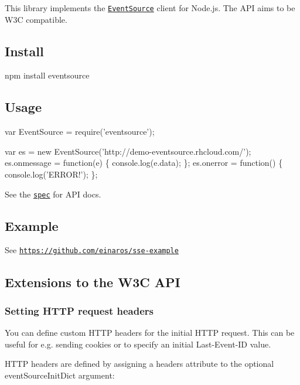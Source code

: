 \href{https://nodei.co/npm/eventsource/}{\tt } \href{https://nodei.co/npm/eventsource/}{\tt }

This library implements the \href{http://dev.w3.org/html5/eventsource/}{\tt Event\+Source} client for Node.\+js. The A\+PI aims to be W3C compatible.

\subsection*{Install}

\begin{DoxyVerb}npm install eventsource
\end{DoxyVerb}


\subsection*{Usage}


\begin{DoxyCode}
var EventSource = require('eventsource');

var es = new EventSource('http://demo-eventsource.rhcloud.com/');
es.onmessage = function(e) \{
  console.log(e.data);
\};
es.onerror = function() \{
  console.log('ERROR!');
\};
\end{DoxyCode}


See the \href{http://dev.w3.org/html5/eventsource/}{\tt spec} for A\+PI docs.

\subsection*{Example}

See \href{https://github.com/einaros/sse-example}{\tt https\+://github.\+com/einaros/sse-\/example}

\subsection*{Extensions to the W3C A\+PI}

\subsubsection*{Setting H\+T\+TP request headers}

You can define custom H\+T\+TP headers for the initial H\+T\+TP request. This can be useful for e.\+g. sending cookies or to specify an initial {\ttfamily Last-\/\+Event-\/\+ID} value.

H\+T\+TP headers are defined by assigning a {\ttfamily headers} attribute to the optional {\ttfamily event\+Source\+Init\+Dict} argument\+:


